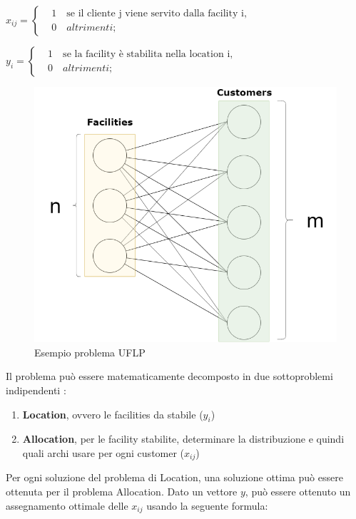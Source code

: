 \documentclass[a4paper,12pt,titlepage,oneside]{article}
\begin{document}
$x_{ij}=\left\{\begin{aligned}
 & 1 \quad \text{se il cliente j viene servito dalla facility i},\\ 
 & 0 \quad altrimenti;
\end{aligned}\right.$

$y_{i}=\left\{\begin{aligned}
 & 1 \quad \text{se la facility è stabilita nella location i},\\ 
 & 0 \quad altrimenti;
\end{aligned}\right.$
\begin{figure}[h!]
  \centering
  \includegraphics[scale=.3]{UFLP_Sample.png}
  \caption{Esempio problema UFLP}
\end{figure}


Il problema può essere matematicamente decomposto in due sottoproblemi indipendenti \cite{Sultan1999}:
\begin{enumerate}
\item \textbf{Location}, ovvero le facilities da stabile ($y_{i}$)
\item \textbf{Allocation}, per le facility stabilite, determinare la distribuzione e quindi quali archi usare per ogni customer ($x_{ij}$) 
\end{enumerate}

Per ogni soluzione del problema di Location, una soluzione ottima può essere ottenuta per il problema Allocation. Dato un vettore $y$, può essere ottenuto un assegnamento ottimale delle $x_{ij}$ usando la seguente formula:
\end{document}
